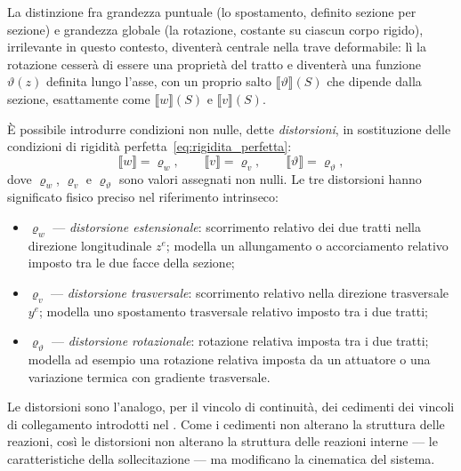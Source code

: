 \begin{oss}
	La distinzione fra grandezza puntuale (lo	spostamento, definito sezione per sezione) e	grandezza globale (la rotazione, costante su	ciascun corpo rigido), irrilevante in questo contesto, diventerà centrale nella trave	deformabile: lì la rotazione cesserà di essere	una proprietà del tratto e diventerà una	funzione $\vartheta(z)$ definita lungo l'asse,	con un proprio salto $\llbracket\vartheta\rrbracket(S)$	che dipende dalla sezione, esattamente come	$\llbracket w\rrbracket(S)$ e 	$\llbracket v\rrbracket(S)$.
\end{oss}

È possibile introdurre condizioni non nulle,
dette \emph{distorsioni}, in sostituzione delle
condizioni di rigidità perfetta~\eqref{eq:rigidita_perfetta}:
\begin{equation}\label{eq:distorsioni}
	\llbracket w \rrbracket  = \varrho_w, \qquad
	\llbracket v \rrbracket = \varrho_v, \qquad
	\llbracket \vartheta \rrbracket = \varrho_\vartheta,
\end{equation}
dove $\varrho_w$, $\varrho_v$ e $\varrho_\vartheta$
sono valori assegnati non nulli. Le tre distorsioni
hanno significato fisico preciso nel riferimento
intrinseco:

\begin{itemize}[nosep]
	\item $\varrho_w$ --- \emph{distorsione
		estensionale}: scorrimento relativo dei due
	tratti nella direzione longitudinale $z^e$; modella
	un allungamento o accorciamento relativo imposto
	tra le due facce della sezione;
	\item $\varrho_v$ --- \emph{distorsione
		trasversale}: scorrimento relativo nella
	direzione trasversale $y^e$; modella uno
	spostamento trasversale relativo imposto tra
	i due tratti;
	\item $\varrho_\vartheta$ --- \emph{distorsione
		rotazionale}: rotazione relativa imposta tra
	i due tratti; modella ad esempio una rotazione
	relativa imposta da un attuatore o una variazione
	termica con gradiente trasversale.
\end{itemize}

\begin{oss}
	Le distorsioni sono l'analogo, per il vincolo
	di continuità, dei cedimenti dei vincoli di
	collegamento introdotti nel
	. Come i cedimenti non
	alterano la struttura delle reazioni, così le
	distorsioni non alterano la struttura delle
	reazioni interne --- le caratteristiche della
	sollecitazione --- ma modificano la cinematica
	del sistema.
\end{oss}





